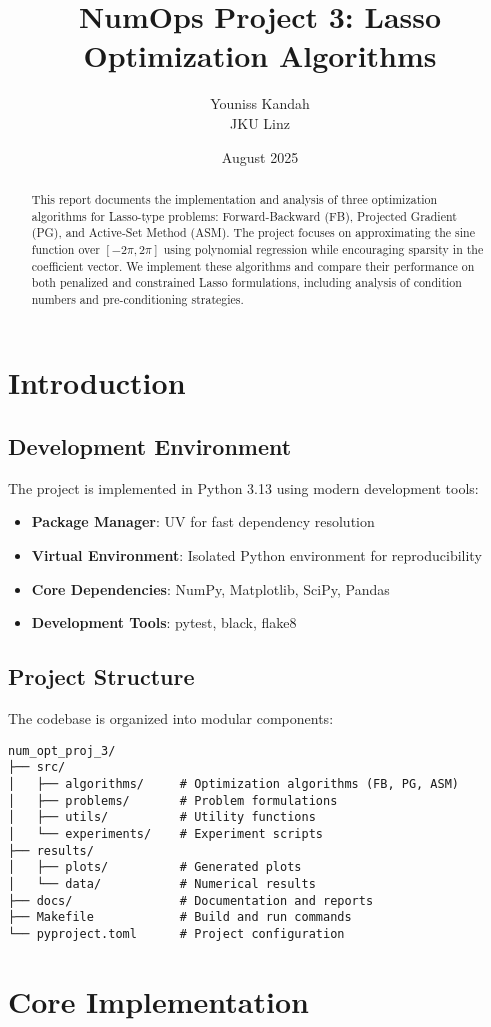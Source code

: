 \documentclass[11pt,a4paper]{article}
\title{NumOps Project 3: Lasso Optimization Algorithms}
\author{Youniss Kandah\\JKU Linz}
\date{August 2025}
\begin{document}
\maketitle

\begin{abstract}
This report documents the implementation and analysis of three optimization algorithms for Lasso-type problems: Forward-Backward (FB), Projected Gradient (PG), and Active-Set Method (ASM). The project focuses on approximating the sine function over $[-2\pi, 2\pi]$ using polynomial regression while encouraging sparsity in the coefficient vector. We implement these algorithms and compare their performance on both penalized and constrained Lasso formulations, including analysis of condition numbers and pre-conditioning strategies.
\end{abstract}

\tableofcontents
\newpage

\section{Introduction}

\subsection{Development Environment}

The project is implemented in Python 3.13 using modern development tools:

\begin{itemize}
    \item \textbf{Package Manager}: UV for fast dependency resolution
    \item \textbf{Virtual Environment}: Isolated Python environment for reproducibility
    \item \textbf{Core Dependencies}: NumPy, Matplotlib, SciPy, Pandas
    \item \textbf{Development Tools}: pytest, black, flake8
\end{itemize}

\subsection{Project Structure}

The codebase is organized into modular components:

\begin{verbatim}
num_opt_proj_3/
├── src/
│   ├── algorithms/     # Optimization algorithms (FB, PG, ASM)
│   ├── problems/       # Problem formulations
│   ├── utils/          # Utility functions
│   └── experiments/    # Experiment scripts
├── results/
│   ├── plots/          # Generated plots
│   └── data/           # Numerical results
├── docs/               # Documentation and reports
├── Makefile            # Build and run commands
└── pyproject.toml      # Project configuration
\end{verbatim}

\section{Core Implementation}
\end{document}
